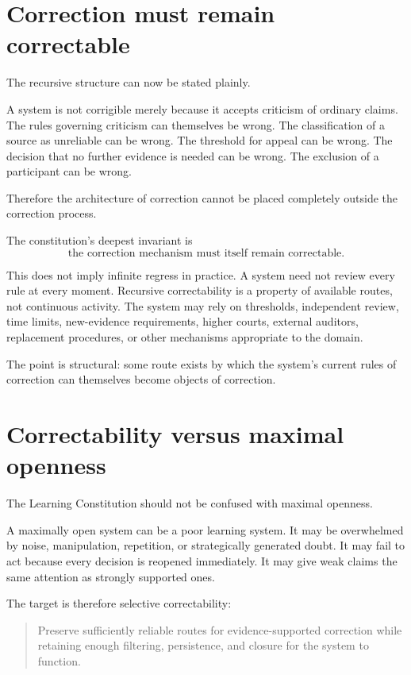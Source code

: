 \documentclass[11pt,a4paper]{article}
\begin{document}
\section{Correction must remain correctable}

The recursive structure can now be stated plainly.

A system is not corrigible merely because it accepts criticism of ordinary claims. The rules governing criticism can themselves be wrong. The classification of a source as unreliable can be wrong. The threshold for appeal can be wrong. The decision that no further evidence is needed can be wrong. The exclusion of a participant can be wrong.

Therefore the architecture of correction cannot be placed completely outside the correction process.

The constitution's deepest invariant is
\[
\boxed{\text{the correction mechanism must itself remain correctable}.}
\]

This does not imply infinite regress in practice. A system need not review every rule at every moment. Recursive correctability is a property of available routes, not continuous activity. The system may rely on thresholds, independent review, time limits, new-evidence requirements, higher courts, external auditors, replacement procedures, or other mechanisms appropriate to the domain.

The point is structural: some route exists by which the system's current rules of correction can themselves become objects of correction.

\section{Correctability versus maximal openness}

The Learning Constitution should not be confused with maximal openness.

A maximally open system can be a poor learning system. It may be overwhelmed by noise, manipulation, repetition, or strategically generated doubt. It may fail to act because every decision is reopened immediately. It may give weak claims the same attention as strongly supported ones.

The target is therefore selective correctability:
\begin{quote}
Preserve sufficiently reliable routes for evidence-supported correction while retaining enough filtering, persistence, and closure for the system to function.
\end{quote}
\end{document}
